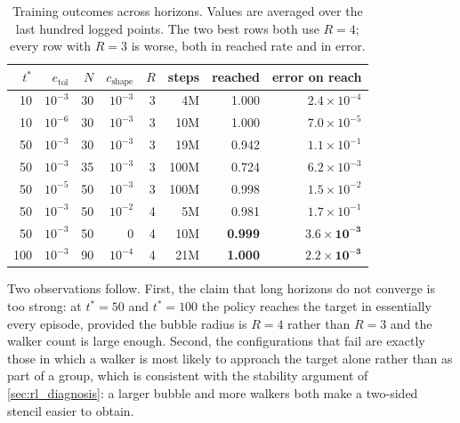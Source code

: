 \begin{table}[htbp]
\centering
\begin{tabular}{@{}rrrrrrrr@{}}
\toprule
$t^*$ & $e_{\mathrm{tol}}$ & $N$ & $c_{\mathrm{shape}}$ & $R$ & steps &
reached & error on reach \\
\midrule
10  & $10^{-3}$ & 30 & $10^{-3}$ & 3 & 4M   & 1.000 & $2.4\times10^{-4}$ \\
10  & $10^{-6}$ & 30 & $10^{-3}$ & 3 & 10M  & 1.000 & $7.0\times10^{-5}$ \\
\midrule
50  & $10^{-3}$ & 30 & $10^{-3}$ & 3 & 19M  & 0.942 & $1.1\times10^{-1}$ \\
50  & $10^{-3}$ & 35 & $10^{-3}$ & 3 & 100M & 0.724 & $6.2\times10^{-3}$ \\
50  & $10^{-5}$ & 50 & $10^{-3}$ & 3 & 100M & 0.998 & $1.5\times10^{-2}$ \\
50  & $10^{-3}$ & 50 & $10^{-2}$ & 4 & 5M   & 0.981 & $1.7\times10^{-1}$ \\
50  & $10^{-3}$ & 50 & $0$       & 4 & 10M  & \textbf{0.999} & $\mathbf{3.6\times10^{-3}}$ \\
\midrule
100 & $10^{-3}$ & 90 & $10^{-4}$ & 4 & 21M  & \textbf{1.000} & $\mathbf{2.2\times10^{-3}}$ \\
\bottomrule
\end{tabular}
\caption{Training outcomes across horizons. Values are averaged over the last
hundred logged points. The two best rows both use $R = 4$; every row with
$R = 3$ is worse, both in reached rate and in error.}
\label{tab:rl_horizons}
\end{table}

Two observations follow. First, the claim that long horizons do not converge is
too strong: at $t^* = 50$ and $t^* = 100$ the policy reaches the target in
essentially every episode, provided the bubble radius is $R = 4$ rather than
$R = 3$ and the walker count is large enough. Second, the configurations that
fail are exactly those in which a walker is most likely to approach the target
alone rather than as part of a group, which is consistent with the stability
argument of \cref{sec:rl_diagnosis}: a larger bubble and more walkers both make
a two-sided stencil easier to obtain.

